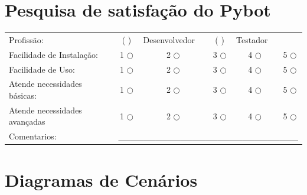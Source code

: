 %
%

\begin{apendicesenv}

    \chapter{Pesquisa de satisfação do Pybot}
    \label{app:quest}

    \begin{table}[H]
    \setlength\extrarowheight{25pt}
    \begin{tabular}{lccccc}
        Profissão:                    & (  )         & \multicolumn{1}{l}{Desenvolvedor}  & (  )         & \multicolumn{1}{l}{Testador}   &              \\
        Facilidade de Instalação:     & 1 $\bigcirc$ & 2 $\bigcirc$                       & 3 $\bigcirc$ & 4 $\bigcirc$                   & 5 $\bigcirc$ \\
        Facilidade de Uso:            & 1 $\bigcirc$ & 2 $\bigcirc$                       & 3 $\bigcirc$ & 4 $\bigcirc$                   & 5 $\bigcirc$ \\
        Atende necessidades básicas:  & 1 $\bigcirc$ & 2 $\bigcirc$                       & 3 $\bigcirc$ & 4 $\bigcirc$                   & 5 $\bigcirc$ \\
        Atende necessidades avançadas & 1 $\bigcirc$ & 2 $\bigcirc$                       & 3 $\bigcirc$ & 4 $\bigcirc$                   & 5 $\bigcirc$ \\
        Comentarios:                  & \multicolumn{5}{l}{\_\_\_\_\_\_\_\_\_\_\_\_\_\_\_\_\_\_\_\_\_\_\_\_\_\_\_\_\_}
    \end{tabular}
    \end{table}

    \chapter{Diagramas de Cenários}
    \label{app:imgs}


\end{apendicesenv}
